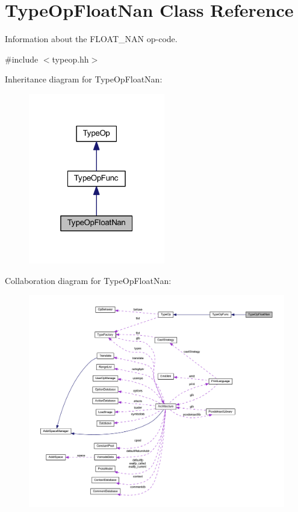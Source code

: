 \hypertarget{class_type_op_float_nan}{}\section{Type\+Op\+Float\+Nan Class Reference}
\label{class_type_op_float_nan}


Information about the F\+L\+O\+A\+T\+\_\+\+N\+AN op-\/code.  




{\ttfamily \#include $<$typeop.\+hh$>$}



Inheritance diagram for Type\+Op\+Float\+Nan\+:
\nopagebreak
\begin{figure}[H]
\begin{center}
\leavevmode
\includegraphics[width=169pt]{class_type_op_float_nan__inherit__graph}
\end{center}
\end{figure}


Collaboration diagram for Type\+Op\+Float\+Nan\+:
\nopagebreak
\begin{figure}[H]
\begin{center}
\leavevmode
\includegraphics[width=350pt]{class_type_op_float_nan__coll__graph}
\end{center}
\end{figure}

